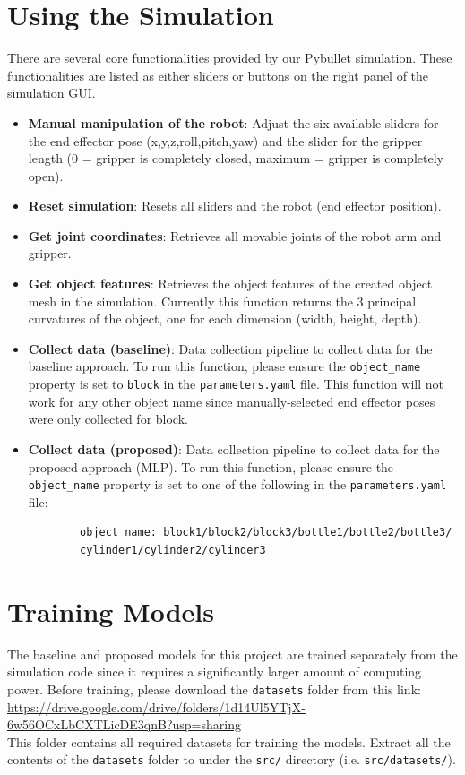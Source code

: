 \documentclass[11pt, a4paper]{report}
\begin{document}
\section{Using the Simulation}\label{apdx:2.3}
There are several core functionalities provided by our Pybullet simulation. These functionalities are listed as either sliders or buttons on the right panel of the simulation GUI.
\begin{itemize}
    \item \textbf{Manual manipulation of the robot}: Adjust the six available sliders for the end effector pose (x,y,z,roll,pitch,yaw) and the slider for the gripper length (0 = gripper is completely closed, maximum = gripper is completely open).
    \item \textbf{Reset simulation}: Resets all sliders and the robot (end effector position).
    \item \textbf{Get joint coordinates}: Retrieves all movable joints of the robot arm and gripper.
    \item \textbf{Get object features}: Retrieves the object features of the created object mesh in the simulation. Currently this function returns the 3 principal curvatures of the object, one for each dimension (width, height, depth).
    \item \textbf{Collect data (baseline)}: Data collection pipeline to collect data for the baseline approach. To run this function, please ensure the \verb|object_name| property is set to \verb|block| in the \verb|parameters.yaml| file. This function will not work for any other object name since manually-selected end effector poses were only collected for block.
    \item \textbf{Collect data (proposed)}: Data collection pipeline to collect data for the proposed approach (MLP). To run this function, please ensure the \verb|object_name| property is set to one of the following in the \verb|parameters.yaml| file:
    \begin{lstlisting}
        object_name: block1/block2/block3/bottle1/bottle2/bottle3/
        cylinder1/cylinder2/cylinder3
    \end{lstlisting}
\end{itemize}

\vspace{-0.2cm}
\section{Training Models}\label{apdx:2.4}
The baseline and proposed models for this project are trained separately from the simulation code since it requires a significantly larger amount of computing power. Before training, please download the \verb|datasets| folder from this link:\\
\noindent \href{https://drive.google.com/drive/folders/1d14Ul5YTjX-6w56OCxLbCXTLicDE3qnB?usp=sharing}{https://drive.google.com/drive/folders/1d14Ul5YTjX-6w56OCxLbCXTLicDE3qnB?usp=sharing}\\
\noindent This folder contains all required datasets for training the models. Extract all the contents of the \verb|datasets| folder to under the \verb|src/| directory (i.e. \verb|src/datasets/|).\\
\end{document}
